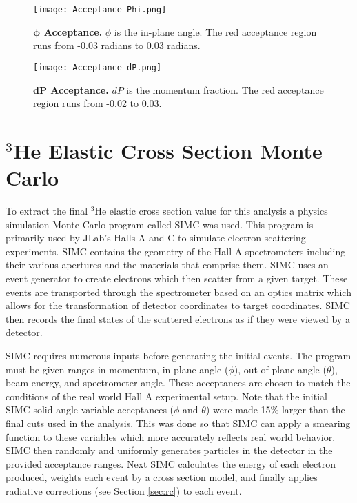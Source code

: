 \begin{figure}[!ht]
\begin{center}
\texttt{[image: Acceptance\_Phi.png]}
\end{center}
\caption[$\phi$ Acceptance]{
{\bf{$\boldsymbol{\phi}$ Acceptance.}} $\phi$ is the in-plane angle. The red acceptance region runs from -0.03 radians to 0.03 radians.}
\label{fig:acceptance_ph}
\end{figure}

\begin{figure}[!ht]
\begin{center}
\texttt{[image: Acceptance\_dP.png]}
\end{center}
\caption[$dP$ Acceptance]{
{\bf{$\boldsymbol{dP}$ Acceptance.}} $dP$ is the momentum fraction. The red acceptance region runs from -0.02 to 0.03.}
\label{fig:acceptance_dp}
\end{figure}

\section{$^3$He Elastic Cross Section Monte Carlo}
\label{sec:simc}

To extract the final $^3$He elastic cross section value for this analysis a physics simulation Monte Carlo program called SIMC was used. This program is primarily used by JLab's Halls A and C to simulate electron scattering experiments. SIMC contains the geometry of the Hall A spectrometers including their various apertures and the materials that comprise them. SIMC uses an event generator to create electrons which then scatter from a given target. These events are transported through the spectrometer based on an optics matrix which allows for the transformation of detector coordinates to target coordinates. SIMC then records the final states of the scattered electrons as if they were viewed by a detector.

SIMC requires numerous inputs before generating the initial events. The program must be given ranges in momentum, in-plane angle ($\phi$), out-of-plane angle ($\theta$), beam energy, and spectrometer angle. These acceptances are chosen to match the conditions of the real world Hall A experimental setup. Note that the initial SIMC solid angle variable acceptances ($\phi$ and $\theta$) were made 15$\%$ larger than the final cuts used in the analysis. This was done so that SIMC can apply a smearing function to these variables which more accurately reflects real world behavior. SIMC then randomly and uniformly generates particles in the detector in the provided acceptance ranges. Next SIMC calculates the energy of each electron produced, weights each event by a cross section model, and finally applies radiative corrections (see Section \ref{sec:rc}) to each event. 

